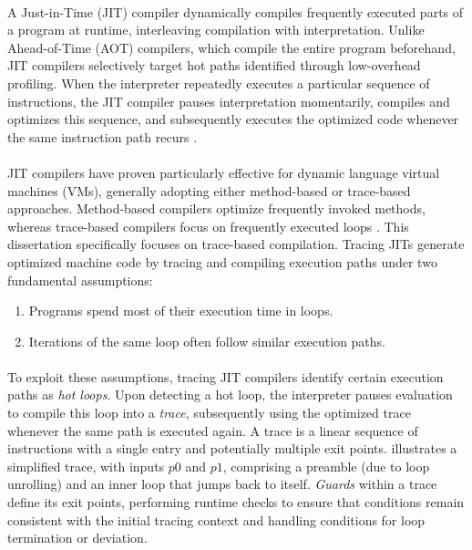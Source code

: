     \paragraph{}%
        A Just-in-Time (JIT) compiler dynamically compiles frequently executed parts of a program at runtime, interleaving compilation with interpretation. Unlike Ahead-of-Time (AOT) compilers, which compile the entire program beforehand, JIT compilers selectively target hot paths identified through low-overhead profiling. When the interpreter repeatedly executes a particular sequence of instructions, the JIT compiler pauses interpretation momentarily, compiles and optimizes this sequence, and subsequently executes the optimized code whenever the same instruction path recurs \cite{dynamo}.

    \paragraph{}%
        JIT compilers have proven particularly effective for dynamic language virtual machines (VMs), generally adopting either method-based or trace-based approaches. Method-based compilers optimize frequently invoked methods, whereas trace-based compilers focus on frequently executed loops \cite{survey:05,jit-history:03}. This dissertation specifically focuses on trace-based compilation. Tracing JITs generate optimized machine code by tracing and compiling execution paths under two fundamental assumptions\cite{pypy-main}:

    \begin{enumerate}
        \item Programs spend most of their execution time in loops.
        \item Iterations of the same loop often follow similar execution paths.
    \end{enumerate}


    \paragraph{}%
        To exploit these assumptions, tracing JIT compilers identify certain execution paths as \emph{hot loops}. Upon detecting a hot loop, the interpreter pauses evaluation to compile this loop into a \emph{trace}, subsequently using the optimized trace whenever the same path is executed again. A trace is a linear sequence of instructions with a single entry and potentially multiple exit points.  illustrates a simplified trace, with inputs $p0$ and $p1$, comprising a preamble (due to loop unrolling) and an inner loop that jumps back to itself. \emph{Guards} within a trace define its exit points, performing runtime checks to ensure that conditions remain consistent with the initial tracing context and handling conditions for loop termination or deviation.

